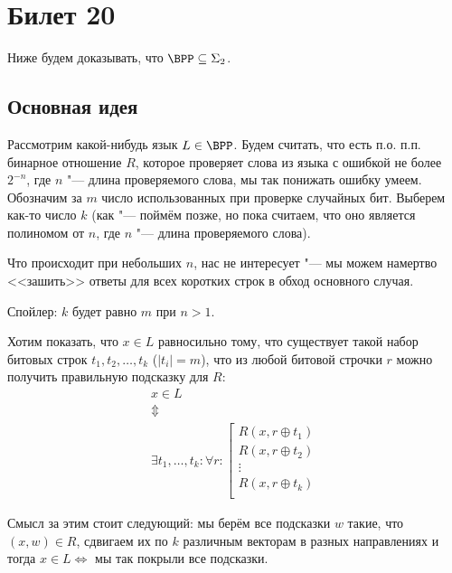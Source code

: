 \setcounter{section}{19}
\section{Билет 20}
	Ниже будем доказывать, что $\BPP \subseteq \Sigma_2$.

\subsection{Основная идея}
	Рассмотрим какой-нибудь язык $L \in \BPP$.
	Будем считать, что есть п.о. п.п. бинарное отношение $R$, которое проверяет слова из
	языка с ошибкой не более $2^{-n}$, где $n$ "--- длина проверяемого слова, мы так понижать ошибку умеем.
	Обозначим за $m$ число использованных при проверке случайных бит.
	Выберем как-то число $k$ (как "--- поймём позже, но пока считаем, что оно является полиномом от $n$, где $n$ "--- длина проверяемого слова).
	\begin{Rem}
		Что происходит при небольших $n$, нас не интересует "--- мы можем намертво <<зашить>> ответы для всех коротких строк в обход основного случая.
	\end{Rem}
	\begin{Rem}
		Спойлер: $k$ будет равно $m$ при $n > 1$.
	\end{Rem}

	Хотим показать, что $x \in L$ равносильно тому, что существует такой набор битовых строк
	$t_1, t_2, \dots, t_k$ ($|t_i|=m$), что из любой битовой строчки $r$ можно получить
	правильную подсказку для $R$:
	\begin{gather*}
		x \in L \\
		\Updownarrow \\
		\exists t_1, \dots, t_k \colon
		\forall r \colon
		\left[
			\begin{array}{l}
				R(x, r \oplus t_1) \\
				R(x, r \oplus t_2) \\
				\vdots \\
				R(x, r \oplus t_k) \\
			\end{array}
		\right.
	\end{gather*}
	\begin{Rem}
		Смысл за этим стоит следующий: мы берём все подсказки $w$ такие, что $(x, w) \in R$,
		сдвигаем их по $k$ различным векторам в разных направлениях и тогда $x \in L \iff$ мы так покрыли все подсказки.
	\end{Rem}

